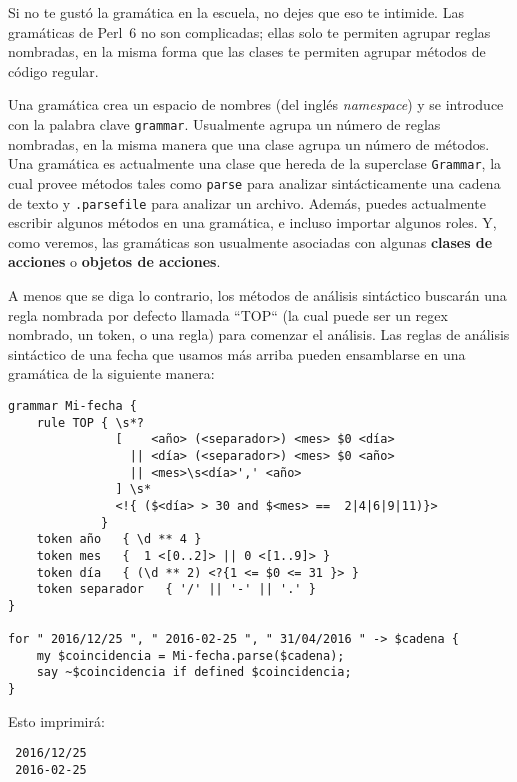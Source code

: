 Si no te gustó la gramática en la escuela, no dejes que eso te 
intimide. Las gramáticas de Perl~6 no son complicadas; ellas solo
te permiten agrupar reglas nombradas, en la misma forma que las clases
te permiten agrupar métodos de código regular.

Una gramática crea un espacio de nombres (del inglés \emph{namespace})
y se introduce con la palabra clave {\tt grammar}. Usualmente
agrupa un número de reglas nombradas, en la misma manera que
una clase agrupa un número de métodos. Una gramática es 
actualmente una clase que hereda de la superclase {\tt Grammar},
la cual provee métodos tales como {\tt parse} para analizar
sintácticamente una cadena de texto y {\tt .parsefile} para
analizar un archivo. Además, puedes actualmente escribir 
algunos métodos en una gramática, e incluso importar algunos
roles. Y, como veremos, las gramáticas son usualmente 
asociadas con algunas {\bf clases de acciones} o 
{\bf objetos de acciones}.

A menos que se diga lo contrario, los métodos de análisis
sintáctico buscarán una regla nombrada por defecto llamada 
``TOP`` (la cual puede ser un regex nombrado, un token, o una 
regla) para comenzar el análisis. Las reglas de análisis 
sintáctico de una fecha que usamos más arriba pueden
ensamblarse en una gramática de la siguiente manera:

\label{dategrammar}
\begin{verbatim}
grammar Mi-fecha {
    rule TOP { \s*? 
               [    <año> (<separador>) <mes> $0 <día>
                 || <día> (<separador>) <mes> $0 <año> 
                 || <mes>\s<día>',' <año>                     
               ] \s* 
               <!{ ($<día> > 30 and $<mes> ==  2|4|6|9|11)}>  
             }
    token año   { \d ** 4 }                                        
    token mes   {  1 <[0..2]> || 0 <[1..9]> }                
    token día   { (\d ** 2) <?{1 <= $0 <= 31 }> }  
    token separador   { '/' || '-' || '.' } 
}                         

for " 2016/12/25 ", " 2016-02-25 ", " 31/04/2016 " -> $cadena {
	my $coincidencia = Mi-fecha.parse($cadena);
	say ~$coincidencia if defined $coincidencia;
}
\end{verbatim}

Esto imprimirá:
\begin{verbatim}
 2016/12/25
 2016-02-25
\end{verbatim}

